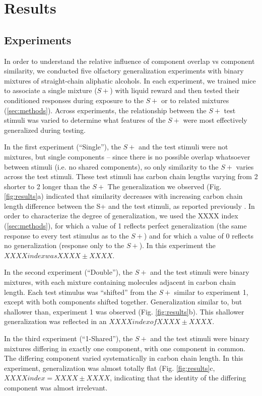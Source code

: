 \section{Results}
\label{results}
\subsection{Experiments}
\label{results_experiments}
In order to understand the relative influence of component overlap vs component similarity, we conducted five olfactory generalization experiments with binary mixtures of straight-chain aliphatic alcohols.  In each experiment, we trained mice to associate a single mixture ($S+$) with liquid reward and then tested their conditioned responses during exposure to the $S+$ or to related mixtures (\ref{sec:methods}).  Across experiments, the relationship between the $S+$ test stimuli was varied to determine what features of the $S+$ were most effectively generalized during testing.  

In the first experiment (``Single''), the $S+$ and the test stimuli were not mixtures, but single components -- since there is no possible overlap whatsoever between stimuli (i.e. no shared components), so only similarity to the $S+$ varies across the test stimuli.  These test stimuli has carbon chain lengths varying from 2 shorter to 2 longer than the $S+$  The generalization we observed (Fig. \ref{fig:results}a) indicated that similarity decreases with increasing carbon chain length difference between the S+ and the test stimuli, as reported previously \cite{18810459}\cite{24488965}.  In order to characterize the degree of generalization, we used the XXXX index (\ref{sec:methods}), for which a value of 1 reflects perfect generalization (the same response to every test stimulus as to the $S+$) and for which a value of 0 reflects no generalization (response only to the $S+$).  In this experiment the $XXXX index was XXXX \pm XXXX$.  

In the second experiment (``Double''), the $S+$ and the test stimuli were binary mixtures, with each mixture containing molecules adjacent in carbon chain length.  Each test stimulus was ``shifted'' from the $S+$ similar to experiment 1, except with both components shifted together.  Generalization similar to, but shallower than, experiment 1 was observed (Fig. \ref{fig:results}b).  This shallower generalization was reflected in an $XXXX index of XXXX \pm XXXX$.  

In the third experiment (``1-Shared''), the $S+$ and the test stimuli were binary mixtures differing in exactly one component, with one component in common.  The differing component varied systematically in carbon chain length.  In this experiment, generalization was almost totally flat (Fig. \ref{fig:results}c, $XXXX index = XXXX \pm XXXX$, indicating that the identity of the differing component was almost irrelevant.  

